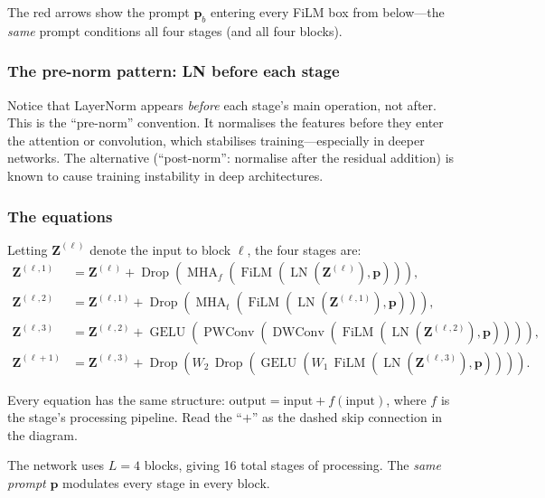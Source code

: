 \documentclass[11pt,a4paper]{article}
\newcommand{\bZ}{\mathbf{Z}}
\newcommand{\bp}{\mathbf{p}}
\DeclareMathOperator{\GELU}{GELU}
\DeclareMathOperator{\LN}{LN}
\DeclareMathOperator{\FiLM}{FiLM}
\DeclareMathOperator{\MHA}{MHA}
\DeclareMathOperator{\DWConv}{DWConv}
\DeclareMathOperator{\PWConv}{PWConv}
\DeclareMathOperator{\Drop}{Drop}
\begin{document}
	The red arrows show the prompt $\bp_b$ entering every FiLM box from below---the \emph{same} prompt conditions all four stages (and all four blocks).
	
	\subsubsection*{The pre-norm pattern: LN before each stage}
	
	Notice that LayerNorm appears \emph{before} each stage's main operation, not after.  This is the ``pre-norm'' convention.  It normalises the features before they enter the attention or convolution, which stabilises training---especially in deeper networks.  The alternative (``post-norm'': normalise after the residual addition) is known to cause training instability in deep architectures.
	
	\subsubsection*{The equations}
	
	Letting $\bZ^{(\ell)}$ denote the input to block $\ell$, the four stages are:
	\begin{align}
		\bZ^{(\ell,1)} &= \bZ^{(\ell)} + \Drop\!\left(\MHA_f\!\left(\FiLM(\LN(\bZ^{(\ell)}), \bp)\right)\right), \\
		\bZ^{(\ell,2)} &= \bZ^{(\ell,1)} + \Drop\!\left(\MHA_t\!\left(\FiLM(\LN(\bZ^{(\ell,1)}), \bp)\right)\right), \\
		\bZ^{(\ell,3)} &= \bZ^{(\ell,2)} + \GELU\!\left(\PWConv\!\left(\DWConv\!\left(\FiLM(\LN(\bZ^{(\ell,2)}), \bp)\right)\right)\right), \\
		\bZ^{(\ell+1)} &= \bZ^{(\ell,3)} + \Drop\!\left(W_2\,\Drop\!\left(\GELU(W_1\,\FiLM(\LN(\bZ^{(\ell,3)}), \bp))\right)\right).
	\end{align}
	
	Every equation has the same structure: $\text{output} = \text{input} + f(\text{input})$, where $f$ is the stage's processing pipeline.  Read the ``$+$'' as the dashed skip connection in the diagram.
	
	The network uses $L = 4$ blocks, giving 16 total stages of processing.  The \emph{same prompt} $\bp$ modulates every stage in every block.
	
	
	
\end{document}
